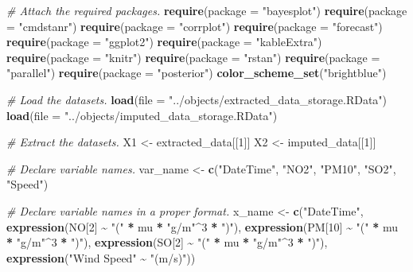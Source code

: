 \documentclass[
]{article}
\newenvironment{Shaded}{\begin{snugshade}}{\end{snugshade}}
\newcommand{\AttributeTok}[1]{\textcolor[rgb]{0.13,0.29,0.53}{#1}}
\newcommand{\CommentTok}[1]{\textcolor[rgb]{0.56,0.35,0.01}{\textit{#1}}}
\newcommand{\DecValTok}[1]{\textcolor[rgb]{0.00,0.00,0.81}{#1}}
\newcommand{\FunctionTok}[1]{\textcolor[rgb]{0.13,0.29,0.53}{\textbf{#1}}}
\newcommand{\NormalTok}[1]{#1}
\newcommand{\OtherTok}[1]{\textcolor[rgb]{0.56,0.35,0.01}{#1}}
\newcommand{\SpecialCharTok}[1]{\textcolor[rgb]{0.81,0.36,0.00}{\textbf{#1}}}
\newcommand{\StringTok}[1]{\textcolor[rgb]{0.31,0.60,0.02}{#1}}
\begin{document}
\begin{Shaded}
\begin{Highlighting}[]
\CommentTok{\# Attach the required packages.}
\FunctionTok{require}\NormalTok{(}\AttributeTok{package =} \StringTok{"bayesplot"}\NormalTok{)}
\FunctionTok{require}\NormalTok{(}\AttributeTok{package =} \StringTok{"cmdstanr"}\NormalTok{)}
\FunctionTok{require}\NormalTok{(}\AttributeTok{package =} \StringTok{"corrplot"}\NormalTok{)}
\FunctionTok{require}\NormalTok{(}\AttributeTok{package =} \StringTok{"forecast"}\NormalTok{)}
\FunctionTok{require}\NormalTok{(}\AttributeTok{package =} \StringTok{"ggplot2"}\NormalTok{)}
\FunctionTok{require}\NormalTok{(}\AttributeTok{package =} \StringTok{"kableExtra"}\NormalTok{)}
\FunctionTok{require}\NormalTok{(}\AttributeTok{package =} \StringTok{"knitr"}\NormalTok{)}
\FunctionTok{require}\NormalTok{(}\AttributeTok{package =} \StringTok{"rstan"}\NormalTok{)}
\FunctionTok{require}\NormalTok{(}\AttributeTok{package =} \StringTok{"parallel"}\NormalTok{)}
\FunctionTok{require}\NormalTok{(}\AttributeTok{package =} \StringTok{"posterior"}\NormalTok{)}
\FunctionTok{color\_scheme\_set}\NormalTok{(}\StringTok{"brightblue"}\NormalTok{)}


\CommentTok{\# Load the datasets.}
\FunctionTok{load}\NormalTok{(}\AttributeTok{file =} \StringTok{"../objects/extracted\_data\_storage.RData"}\NormalTok{)}
\FunctionTok{load}\NormalTok{(}\AttributeTok{file =} \StringTok{"../objects/imputed\_data\_storage.RData"}\NormalTok{)}

\CommentTok{\# Extract the datasets.}
\NormalTok{X1 }\OtherTok{\textless{}{-}}\NormalTok{ extracted\_data[[}\DecValTok{1}\NormalTok{]]}
\NormalTok{X2 }\OtherTok{\textless{}{-}}\NormalTok{ imputed\_data[[}\DecValTok{1}\NormalTok{]]}

\CommentTok{\# Declare variable names.}
\NormalTok{var\_name }\OtherTok{\textless{}{-}} \FunctionTok{c}\NormalTok{(}\StringTok{"DateTime"}\NormalTok{, }\StringTok{"NO2"}\NormalTok{, }\StringTok{"PM10"}\NormalTok{, }\StringTok{"SO2"}\NormalTok{, }\StringTok{"Speed"}\NormalTok{)}

\CommentTok{\# Declare variable names in a proper format.}
\NormalTok{x\_name }\OtherTok{\textless{}{-}} \FunctionTok{c}\NormalTok{(}\StringTok{"DateTime"}\NormalTok{, }
            \FunctionTok{expression}\NormalTok{(NO[}\DecValTok{2}\NormalTok{] }\SpecialCharTok{\textasciitilde{}} \StringTok{"("} \SpecialCharTok{*}\NormalTok{ mu }\SpecialCharTok{*} \StringTok{"g/m"}\SpecialCharTok{\^{}}\DecValTok{3} \SpecialCharTok{*} \StringTok{")"}\NormalTok{), }
            \FunctionTok{expression}\NormalTok{(PM[}\DecValTok{10}\NormalTok{] }\SpecialCharTok{\textasciitilde{}} \StringTok{"("} \SpecialCharTok{*}\NormalTok{ mu }\SpecialCharTok{*} \StringTok{"g/m"}\SpecialCharTok{\^{}}\DecValTok{3} \SpecialCharTok{*} \StringTok{")"}\NormalTok{),}
            \FunctionTok{expression}\NormalTok{(SO[}\DecValTok{2}\NormalTok{] }\SpecialCharTok{\textasciitilde{}} \StringTok{"("} \SpecialCharTok{*}\NormalTok{ mu }\SpecialCharTok{*} \StringTok{"g/m"}\SpecialCharTok{\^{}}\DecValTok{3} \SpecialCharTok{*} \StringTok{")"}\NormalTok{), }
            \FunctionTok{expression}\NormalTok{(}\StringTok{"Wind Speed"} \SpecialCharTok{\textasciitilde{}} \StringTok{"(m/s)"}\NormalTok{))}


\end{Highlighting}
\end{Shaded}
\end{document}

